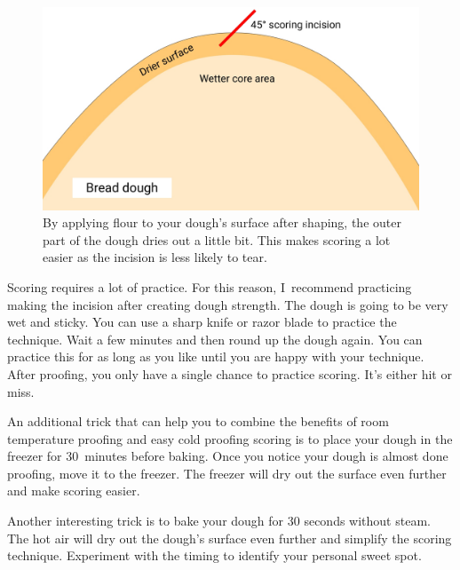 \begin{figure}[htb!]
  \includegraphics[width=\textwidth]{dry-dough-surface}
  \caption[Drying the dough surface]{By applying flour to your dough's surface
      after shaping, the outer part of the dough dries out a little bit. This
      makes scoring a lot easier as the incision is less likely to tear.}%
  \label{fig:dried-out-dough-scoring}
\end{figure}


Scoring requires a lot of practice. For this reason, I~recommend
practicing making the incision after creating dough strength. The dough
is going to be very wet and sticky. You can use a sharp knife or razor
blade to practice the technique. Wait a few minutes and then round
up the dough again. You can practice this for as long as you like
until you are happy with your technique. After proofing, you only
have a single chance to practice scoring. It's either hit or miss.

An additional trick that can help you to combine the benefits
of room temperature proofing and easy cold proofing scoring
is to place your dough in the freezer for 30~minutes before baking.
Once you notice your dough is almost done proofing, move it to the
freezer. The freezer will dry out the surface even further and make
scoring easier.

Another interesting trick is to bake your dough for 30 seconds without steam.
The hot air will dry out the dough's surface even further and simplify
the scoring technique. Experiment with the timing to identify your personal
sweet spot.

